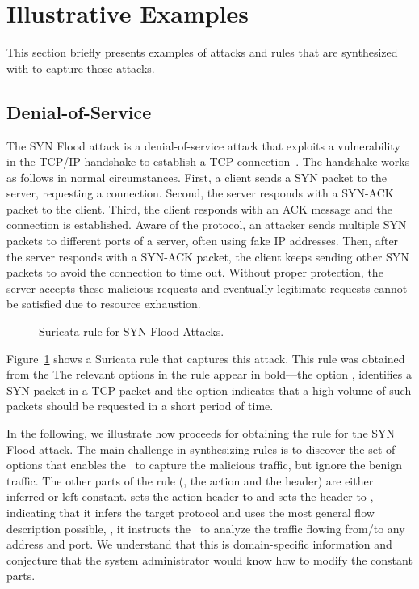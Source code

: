 \documentclass[runningheads]{llncs}
\begin{document}
\section{Illustrative Examples}
\label{sec:suri-metas-coverage}


This section briefly presents examples of attacks and rules that are
synthesized with \tname{} to capture those attacks.


\subsection{Denial-of-Service}

The SYN Flood attack is a denial-of-service attack that exploits a vulnerability in the TCP/IP handshake
to establish a TCP connection~\cite{cloudfare-synflood}. The handshake
works as follows in normal circumstances. First, a client sends a SYN
packet to the server, requesting a connection. Second, the server
responds with a SYN-ACK packet to the client. Third, the client
responds with an ACK message and the connection is established. Aware
of the protocol, an attacker sends multiple SYN packets to different
ports of a server, often using fake IP addresses. Then, after the
server responds with a SYN-ACK packet, the client keeps sending other
SYN packets to avoid the connection to time out. Without proper
protection, the server accepts these malicious requests and eventually
legitimate requests cannot be satisfied due to resource exhaustion.

\begin{figure}[h!]
  
  \caption{Suricata rule for SYN Flood Attacks.}
  \label{fig:synflood-example}
\end{figure}


Figure~\ref{fig:synflood-example} shows a Suricata rule that captures
this attack. This rule was obtained from the 
The relevant options in the rule appear in bold---the option
, identifies a SYN packet in a TCP packet and the
option  indicates that a high volume of such packets should be
requested in a short period of time.




In the following, we illustrate how \tname{} proceeds for obtaining
the rule for the SYN Flood attack. The main challenge in synthesizing
rules is to discover the set of options that enables the \nids\ to
capture the malicious traffic, but ignore the benign traffic.  The
other parts of the rule (\ie{}, the action and the header) are either
inferred or left constant. \tname{} sets the action header to
 and sets the header to , indicating that it infers the target protocol and uses the
most general flow description possible, \ie{}, it instructs the
\nids\ to analyze the traffic flowing from/to any address and port.
We understand that this is domain-specific information and conjecture
that the system administrator would know how to modify the constant
parts.
\end{document}
